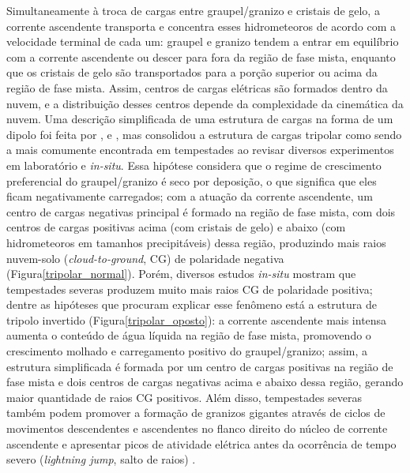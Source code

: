 Simultaneamente à troca de cargas entre graupel/granizo e cristais de gelo, a corrente ascendente transporta e concentra esses hidrometeoros de acordo com a velocidade terminal de cada um: graupel e granizo tendem a entrar em equilíbrio com a corrente ascendente ou descer para fora da região de fase mista, enquanto que os cristais de gelo são transportados para a porção superior ou acima da região de fase mista. Assim, centros de cargas elétricas são formados dentro da nuvem, e a distribuição desses centros depende da complexidade da cinemática da nuvem. Uma descrição simplificada de uma estrutura de cargas na forma de um dipolo foi feita por ,  e , mas  consolidou a estrutura de cargas tripolar como sendo a mais comumente encontrada em tempestades ao revisar diversos experimentos em laboratório e \textit{in-situ}. Essa hipótese considera que o regime de crescimento preferencial do graupel/granizo é seco por deposição, o que significa que eles ficam negativamente carregados; com a atuação da corrente ascendente, um centro de cargas negativas principal é formado na região de fase mista, com dois centros de cargas positivas acima (com cristais de gelo) e abaixo (com hidrometeoros em tamanhos precipitáveis) dessa região, produzindo mais raios nuvem-solo (\textit{cloud-to-ground}, CG) de polaridade negativa (Figura\autoref{tripolar_normal}). Porém, diversos estudos \textit{in-situ}  \cite{Macgorman1994, Carey1995a, Lyons1998, Carey2003e, Carey2007, Pineda2016} mostram que tempestades severas produzem muito mais raios CG de polaridade positiva; dentre as hipóteses que procuram explicar esse fenômeno está a estrutura de tripolo invertido (Figura\autoref{tripolar_oposto}): a corrente ascendente mais intensa aumenta o conteúdo de água líquida na região de fase mista, promovendo o crescimento molhado e carregamento positivo do graupel/granizo; assim, a estrutura simplificada é formada por um centro de cargas positivas na região de fase mista e dois centros de cargas negativas acima e abaixo dessa região, gerando maior quantidade de raios CG positivos. Além disso, tempestades severas também podem promover a formação de granizos gigantes através de ciclos de movimentos descendentes e ascendentes no flanco direito do núcleo de corrente ascendente \cite{Knight1970, Knight2001c, Knight2005} e apresentar picos de atividade elétrica antes da ocorrência de tempo severo (\textit{lightning jump}, salto de raios) \cite{Goodman1988, Williams1999, Schultz2009a, Gatlin2010, Schultz2011}.

